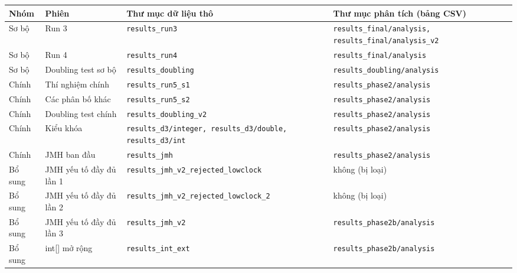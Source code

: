 \setlength{\tabcolsep}{3pt}
\begin{tabularx}{\linewidth}{llXX}
\toprule
Nhóm & Phiên & Thư mục dữ liệu thô & Thư mục phân tích (bảng CSV) \\
\midrule
Sơ bộ & Run 3 & \texttt{results\_\allowbreak{}run3} & \texttt{results\_\allowbreak{}final/analysis, results\_\allowbreak{}final/analysis\_\allowbreak{}v2} \\
Sơ bộ & Run 4 & \texttt{results\_\allowbreak{}run4} & \texttt{results\_\allowbreak{}final/analysis} \\
Sơ bộ & Doubling test sơ bộ & \texttt{results\_\allowbreak{}doubling} & \texttt{results\_\allowbreak{}doubling/analysis} \\
Chính & Thí nghiệm chính & \texttt{results\_\allowbreak{}run5\_\allowbreak{}s1} & \texttt{results\_\allowbreak{}phase2/analysis} \\
Chính & Các phân bố khác & \texttt{results\_\allowbreak{}run5\_\allowbreak{}s2} & \texttt{results\_\allowbreak{}phase2/analysis} \\
Chính & Doubling test chính & \texttt{results\_\allowbreak{}doubling\_\allowbreak{}v2} & \texttt{results\_\allowbreak{}phase2/analysis} \\
Chính & Kiểu khóa & \texttt{results\_\allowbreak{}d3/integer, results\_\allowbreak{}d3/double, results\_\allowbreak{}d3/int} & \texttt{results\_\allowbreak{}phase2/analysis} \\
Chính & JMH ban đầu & \texttt{results\_\allowbreak{}jmh} & \texttt{results\_\allowbreak{}phase2/analysis} \\
Bổ sung & JMH yếu tố đầy đủ lần 1 & \texttt{results\_\allowbreak{}jmh\_\allowbreak{}v2\_\allowbreak{}rejected\_\allowbreak{}lowclock} & không (bị loại) \\
Bổ sung & JMH yếu tố đầy đủ lần 2 & \texttt{results\_\allowbreak{}jmh\_\allowbreak{}v2\_\allowbreak{}rejected\_\allowbreak{}lowclock\_\allowbreak{}2} & không (bị loại) \\
Bổ sung & JMH yếu tố đầy đủ lần 3 & \texttt{results\_\allowbreak{}jmh\_\allowbreak{}v2} & \texttt{results\_\allowbreak{}phase2b/analysis} \\
Bổ sung & int[] mở rộng & \texttt{results\_\allowbreak{}int\_\allowbreak{}ext} & \texttt{results\_\allowbreak{}phase2b/analysis} \\
\bottomrule
\end{tabularx}
